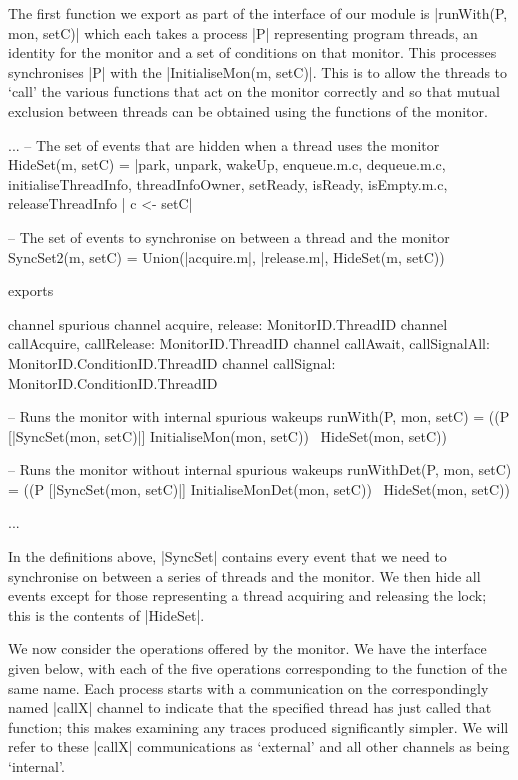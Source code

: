 The first function we export as part of the interface of our module is |runWith(P, mon, setC)| which each takes a process |P| representing program threads, an identity for the monitor and a set of conditions on that monitor. This processes synchronises |P| with the |InitialiseMon(m, setC)|. This is to allow the threads to `call' the various functions that act on the monitor correctly and so that mutual exclusion between threads can be obtained using the functions of the monitor. 

\begin{cspm}
  ...
  -- The set of events that are hidden when a thread uses the monitor
  HideSet(m, setC) = 
    {|park, unpark, wakeUp, enqueue.m.c, dequeue.m.c, initialiseThreadInfo, threadInfoOwner,
      setReady, isReady, isEmpty.m.c, releaseThreadInfo | c <- setC|}

  -- The set of events to synchronise on between a thread and the monitor
    SyncSet2(m, setC) = Union({{|acquire.m|}, {|release.m|}, HideSet(m, setC)})

exports

  channel spurious
  channel acquire, release: MonitorID.ThreadID
  channel callAcquire, callRelease: MonitorID.ThreadID
  channel callAwait, callSignalAll: MonitorID.ConditionID.ThreadID
  channel callSignal: MonitorID.ConditionID.ThreadID

  -- Runs the monitor with internal spurious wakeups
  runWith(P, mon, setC) = 
    ((P [|SyncSet(mon, setC)|] 
          InitialiseMon(mon, setC)) \ HideSet(mon, setC))

  -- Runs the monitor without internal spurious wakeups
  runWithDet(P, mon, setC) = 
    ((P [|SyncSet(mon, setC)|] 
          InitialiseMonDet(mon, setC)) \  HideSet(mon, setC))

  ...
\end{cspm}

In the definitions above, |SyncSet| contains every event that we need to synchronise on between a series of threads and the monitor. We then hide all events except for those representing a thread acquiring and releasing the lock; this is the contents of |HideSet|.

We now consider the operations offered by the monitor. We have the interface given below, with each of the five operations corresponding to the function of the same name. Each process starts with a communication on the correspondingly named |callX| channel to indicate that the specified thread has just called that function; this makes examining any traces produced significantly simpler. We will refer to these |callX| communications as `external' and all other channels as being `internal'. 
  
